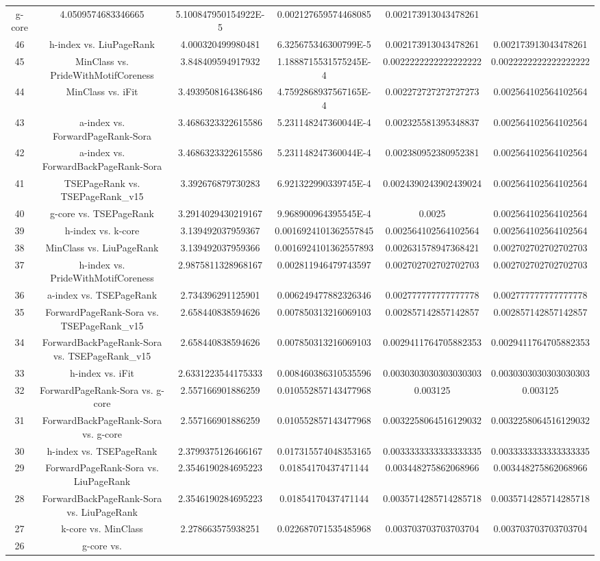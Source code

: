 \documentclass[a4paper,10pt]{article}
\begin{document}
\begin{landscape}
\begin{table}[!htp]
\begin{tabular}{cccccc}
g-core&4.0509574683346665&5.100847950154922E-5&0.002127659574468085&0.002173913043478261\\46&h-index vs. LiuPageRank&4.000320499980481&6.325675346300799E-5&0.002173913043478261&0.002173913043478261\\45&MinClass vs. PrideWithMotifCoreness&3.848409594917932&1.1888715531575245E-4&0.0022222222222222222&0.0022222222222222222\\44&MinClass vs. iFit&3.4939508164386486&4.7592868937567165E-4&0.002272727272727273&0.002564102564102564\\43&a-index vs. ForwardPageRank-Sora&3.4686323322615586&5.231148247360044E-4&0.002325581395348837&0.002564102564102564\\42&a-index vs. ForwardBackPageRank-Sora&3.4686323322615586&5.231148247360044E-4&0.002380952380952381&0.002564102564102564\\41&TSEPageRank vs. TSEPageRank_v15&3.392676879730283&6.921322990339745E-4&0.0024390243902439024&0.002564102564102564\\40&g-core vs. TSEPageRank&3.2914029430219167&9.968900964395545E-4&0.0025&0.002564102564102564\\39&h-index vs. k-core&3.139492037959367&0.0016924101362557845&0.002564102564102564&0.002564102564102564\\38&MinClass vs. LiuPageRank&3.139492037959366&0.0016924101362557893&0.002631578947368421&0.002702702702702703\\37&h-index vs. PrideWithMotifCoreness&2.9875811328968167&0.002811946479743597&0.002702702702702703&0.002702702702702703\\36&a-index vs. TSEPageRank&2.734396291125901&0.006249477882326346&0.002777777777777778&0.002777777777777778\\35&ForwardPageRank-Sora vs. TSEPageRank_v15&2.658440838594626&0.007850313216069103&0.002857142857142857&0.002857142857142857\\34&ForwardBackPageRank-Sora vs. TSEPageRank_v15&2.658440838594626&0.007850313216069103&0.0029411764705882353&0.0029411764705882353\\33&h-index vs. iFit&2.6331223544175333&0.008460386310535596&0.0030303030303030303&0.0030303030303030303\\32&ForwardPageRank-Sora vs. g-core&2.557166901886259&0.010552857143477968&0.003125&0.003125\\31&ForwardBackPageRank-Sora vs. g-core&2.557166901886259&0.010552857143477968&0.0032258064516129032&0.0032258064516129032\\30&h-index vs. TSEPageRank&2.3799375126466167&0.017315574048353165&0.0033333333333333335&0.0033333333333333335\\29&ForwardPageRank-Sora vs. LiuPageRank&2.3546190284695223&0.01854170437471144&0.003448275862068966&0.003448275862068966\\28&ForwardBackPageRank-Sora vs. LiuPageRank&2.3546190284695223&0.01854170437471144&0.0035714285714285718&0.0035714285714285718\\27&k-core vs. MinClass&2.278663575938251&0.022687071535485968&0.003703703703703704&0.003703703703703704\\26&g-core vs. 
\end{tabular}
\end{table}
\end{landscape}
\end{document}
